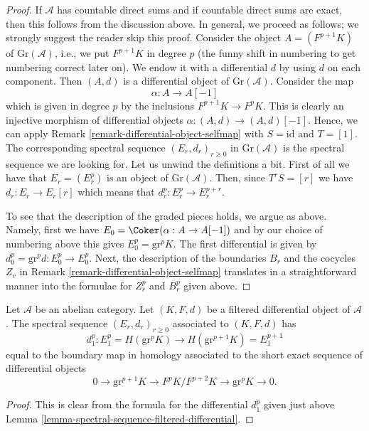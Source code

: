 \begin{proof}
If $\mathcal{A}$ has countable direct sums and if countable direct
sums are exact, then this follows from the discussion above.
In general, we proceed as follows; we strongly suggest the reader
skip this proof. Consider the object $A = (F^{p + 1}K)$ of
$\text{Gr}(\mathcal{A})$, i.e., we put $F^{p + 1}K$ in degree $p$
(the funny shift in numbering to get numbering correct later on).
We endow it with a differential $d$ by using $d$ on each component.
Then $(A, d)$ is a differential object of $\text{Gr}(\mathcal{A})$.
Consider the map
$$
\alpha : A \to A[-1]
$$
which is given in degree $p$ by the inclusions $F^{p + 1}K \to F^pK$.
This is clearly an injective morphism of differential objects
$\alpha : (A, d) \to (A, d)[-1]$. Hence, we can apply
Remark \ref{remark-differential-object-selfmap}
with $S = \text{id}$ and $T = [1]$.
The corresponding spectral sequence $(E_r, d_r)_{r \geq 0}$
in $\text{Gr}(\mathcal{A})$ is the spectral sequence we are looking
for. Let us unwind the definitions a bit.
First of all we have that $E_r = (E_r^p)$ is an object of $\text{Gr}(\mathcal{A})$.
Then, since $T^rS = [r]$ we have $d_r : E_r \to E_r[r]$ which means that
$d_r^p : E_r^p \to E_r^{p + r}$.

\medskip\noindent
To see that the description of the graded pieces holds, we argue
as above. Namely, first we have $E_0 = \Coker(\alpha : A \to A[-1])$
and by our choice of numbering above this gives
$E_0^p = \text{gr}^pK$. The first differential is given by
$d_0^p = \text{gr}^pd : E_0^p \to E_0^p$.
Next, the description of the boundaries $B_r$ and the cocycles $Z_r$
in Remark \ref{remark-differential-object-selfmap}
translates in a straightforward manner into the formulae
for $Z_r^p$ and $B_r^p$ given above.
\end{proof}

\begin{lemma}
\label{lemma-spectral-sequence-filtered-differential-d1}
Let $\mathcal{A}$ be an abelian category. Let $(K, F, d)$ be a filtered
differential object of $\mathcal{A}$. The spectral sequence
$(E_r, d_r)_{r \geq 0}$ associated to $(K, F, d)$ has
$$
d_1^p :
E_1^p = H(\text{gr}^pK)
\longrightarrow
H(\text{gr}^{p + 1}K) = E_1^{p + 1}
$$
equal to the boundary map in homology associated to the short
exact sequence of differential objects
$$
0 \to \text{gr}^{p + 1}K \to F^pK/F^{p + 2}K \to \text{gr}^pK \to 0.
$$
\end{lemma}

\begin{proof}
This is clear from the formula for the differential $d_1^p$
given just above Lemma \ref{lemma-spectral-sequence-filtered-differential}.
\end{proof}

